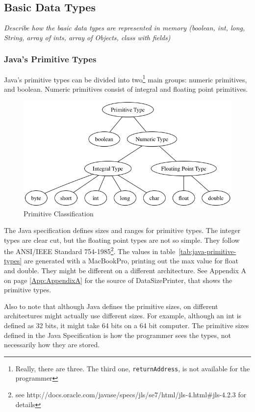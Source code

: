 \subsection{Basic Data Types}
\textit{Describe how the basic data types are represented in memory (boolean, int, long, String, array of ints, array of Objects, class with fields)}
\subsubsection{Java's Primitive Types} 
Java's primitive types can be divided into two\footnote{Really, there are three. The third one, \texttt{returnAddress}, is not available for the programmer} main groups: numeric primitives, and boolean. Numeric primitives consist of integral and floating point primitives.\cite{gosling}

\begin{figure}[H]\centering
\includegraphics[width=\linewidth, frame]{primitives.png}
\caption{Primitive Classification}
\label{fig:results}
\end{figure}

The Java specification\cite{gosling} defines sizes and ranges for primitive types. The integer types are clear cut, but the floating point types are not so simple. They follow the ANSI/IEEE Standard 754-1985\footnote{see http://docs.oracle.com/javase/specs/jls/se7/html/jls-4.html\#jls-4.2.3 for details}. The values in table~\ref{tab:java-primitive-types} are generated with a MacBookPro, printing out the max value for float and double. They might be different on a different architecture. See Appendix A on page \ref{App:AppendixA} for the source of DataSizePrinter, that shows the primitive types.

Also to note that although Java defines the primitive sizes, on different architectures might actually use different sizes. For example, although an int is defined as 32 bits, it might take 64 bits on a 64 bit computer. The primitive sizes defined in the Java Specification is how the programmer sees the types, not necessarily how they are stored.

